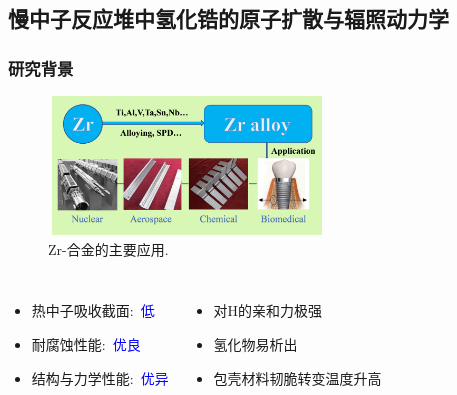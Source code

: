 \subsection{慢中子反应堆中氢化锆的原子扩散与辐照动力学}
\begin{frame}
	\frametitle{研究背景}
\begin{figure}[!ht]
\centering
\vspace*{-0.05in}
\includegraphics[height=1.45in,width=2.90in,viewport=0 0 430 230,clip]{Figures/Zr-Alloy_application.png}
\caption{\tiny \textrm{Zr}-合金的主要应用.}
\label{Fig:Zr-Alloy_Application}
\end{figure}
\vskip -30pt
  \begin{columns}
\begin{itemize}
	\item 热中子吸收截面:~\textcolor{blue}{低}
	\item 耐腐蚀性能:~\textcolor{blue}{优良}
	\item 结构与力学性能:~\textcolor{blue}{优异}
\end{itemize}
\begin{itemize}
	\item 对\textrm{H}的亲和力极强%
	\item 氢化物易析出%
	\item 包壳材料韧脆转变温度升高
\end{itemize}
  \end{columns}
\end{frame}

